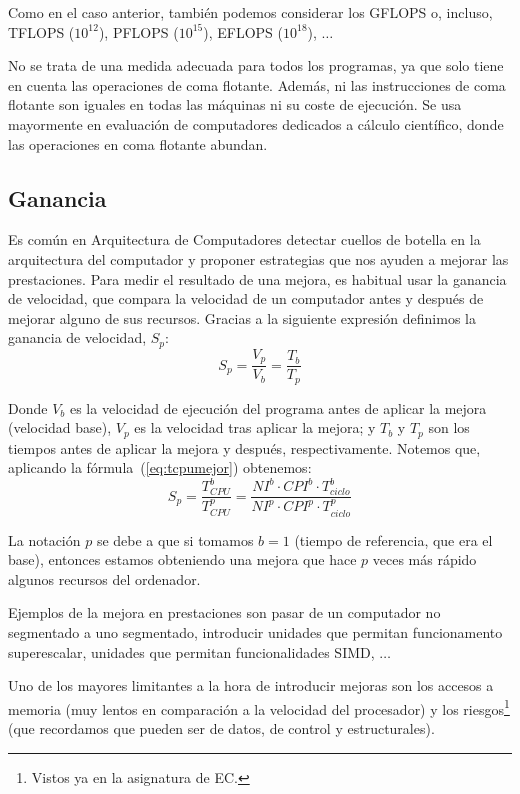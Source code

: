 Como en el caso anterior, también podemos considerar los GFLOPS o, incluso, TFLOPS ($10^{12}$), PFLOPS ($10^{15}$), EFLOPS ($10^{18}$), $\ldots$ 

No se trata de una medida adecuada para todos los programas, ya que solo tiene en cuenta las operaciones de coma flotante. Además, ni las instrucciones de coma flotante son iguales en todas las máquinas ni su coste de ejecución. Se usa mayormente en evaluación de computadores dedicados a cálculo científico, donde las operaciones en coma flotante abundan.

\subsection{Ganancia}
Es común en Arquitectura de Computadores detectar cuellos de botella en la arquitectura del computador y proponer estrategias que nos ayuden a mejorar las prestaciones. Para medir el resultado de una mejora, es habitual usar la ganancia de velocidad, que compara la velocidad de un computador antes y después de mejorar alguno de sus recursos. Gracias a la siguiente expresión definimos la ganancia de velocidad, $S_p$:
\begin{equation}
    S_p = \dfrac{V_p}{V_b} = \dfrac{T_b}{T_p}
\end{equation}

Donde $V_b$ es la velocidad de ejecución del programa antes de aplicar la mejora (velocidad base), $V_p$ es la velocidad tras aplicar la mejora; y $T_b$ y $T_p$ son los tiempos antes de aplicar la mejora y después, respectivamente. Notemos que, aplicando la fórmula~(\ref{eq:tcpumejor}) obtenemos:
\begin{equation}
    S_p = \dfrac{T^b_{CPU}}{T^p_{CPU}} = \dfrac{NI^b \cdot CPI^b \cdot T^b_{ciclo}}{NI^p \cdot CPI^p \cdot T^p_{ciclo}}
\end{equation}

La notación $p$ se debe a que si tomamos $b = 1$ (tiempo de referencia, que era el base), entonces estamos obteniendo una mejora que hace $p$ veces más rápido algunos recursos del ordenador.

Ejemplos de la mejora en prestaciones son pasar de un computador no segmentado a uno segmentado, introducir unidades que permitan funcionamento superescalar, unidades que permitan funcionalidades SIMD, $\ldots$

Uno de los mayores limitantes a la hora de introducir mejoras son los accesos a memoria (muy lentos en comparación a la velocidad del procesador) y los riesgos\footnote{Vistos ya en la asignatura de EC.} (que recordamos que pueden ser de datos, de control y estructurales).

